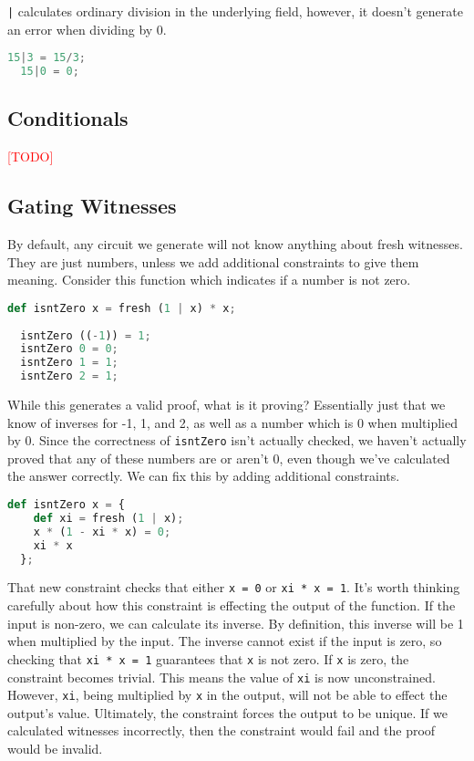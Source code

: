 \lstinline{|} calculates ordinary division in the underlying field, however, it doesn't generate an error when dividing by 0.

\begin{lstlisting}[language=Python]
  15|3 = 15/3;
  15|0 = 0;
\end{lstlisting}










\subsection{Conditionals}

\textcolor{red}{[TODO]}






\subsection{Gating Witnesses} \label{GW}

By default, any circuit we generate will not know anything about fresh witnesses. They are just numbers, unless we add additional constraints to give them meaning. Consider this function which indicates if a number is not zero.

\begin{lstlisting}[language=Python]
  def isntZero x = fresh (1 | x) * x;
  
  isntZero ((-1)) = 1;
  isntZero 0 = 0;
  isntZero 1 = 1;
  isntZero 2 = 1;
\end{lstlisting}

While this generates a valid proof, what is it proving? Essentially just that we know of inverses for -1, 1, and 2, as well as a number which is 0 when multiplied by 0. Since the correctness of \lstinline{isntZero} isn't actually checked, we haven't actually proved that any of these numbers are or aren't 0, even though we've calculated the answer correctly. We can fix this by adding additional constraints.

\begin{lstlisting}[language=Python]
  def isntZero x = {
    def xi = fresh (1 | x);
    x * (1 - xi * x) = 0;
    xi * x
  };
\end{lstlisting}

That new constraint checks that either \lstinline{x = 0} or \lstinline{xi * x = 1}. It's worth thinking carefully about how this constraint is effecting the output of the function. If the input is non-zero, we can calculate its inverse. By definition, this inverse will be 1 when multiplied by the input. The inverse cannot exist if the input is zero, so checking that \lstinline{xi * x = 1} guarantees that \lstinline{x} is not zero. If \lstinline{x} is zero, the constraint becomes trivial. This means the value of \lstinline{xi} is now unconstrained. However, \lstinline{xi}, being multiplied by \lstinline{x} in the output, will not be able to effect the output's value. Ultimately, the constraint forces the output to be unique. If we calculated witnesses incorrectly, then the constraint would fail and the proof would be invalid.


